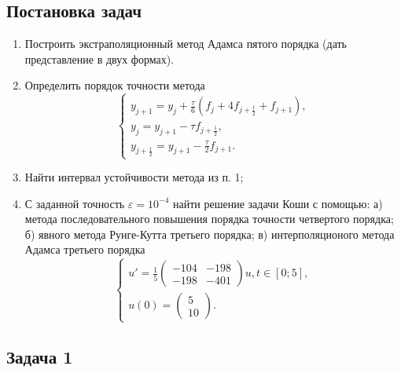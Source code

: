 \documentclass[11pt]{article}
\providecommand{\tightlist}{%
      \setlength{\itemsep}{0pt}\setlength{\parskip}{0pt}}
\begin{document}
    \subsection*{Постановка
задач}\label{ux43fux43eux441ux442ux430ux43dux43eux432ux43aux430-ux437ux430ux434ux430ux447}

    \begin{enumerate}
\def\labelenumi{\arabic{enumi}.}
\tightlist
\item
  Построить экстраполяционный метод Адамса пятого порядка (дать
  представление в двух формах).
\item
  Определить порядок точности метода \[\begin{cases}
  y_{j+1}=y_j+\frac{\tau}{6}(f_j+4f_{j+\frac{1}{2}}+f_{j+1}),\\
  y_j=y_{j+1}-\tau f_{j+\frac{1}{2}}, \\
  y_{j+\frac{1}{2}}=y_{j+1}-\frac{\tau}{2}f_{j+1}.
  \end{cases}\]
\item
  Найти интервал устойчивости метода из п. 1;
\item
  С заданной точность \(\varepsilon=10^{-4}\) найти решение задачи Коши
  с помощью: а) метода последовательного повышения порядка точности
  четвертого порядка; б) явного метода Рунге-Кутта третьего порядка; в)
  интерполяционого метода Адамса третьего порядка \[\begin{cases}
  u'=\frac{1}{5}\begin{pmatrix}-104 & -198 \\
  -198 & -401 \end{pmatrix} u, t \in [0; 5], \\
  u(0)=\begin{pmatrix}5 \\ 10 \end{pmatrix}.
  \end{cases}\]
\end{enumerate}

    \subsection*{Задача 1}\label{ux437ux430ux434ux430ux447ux430-1}
\end{document}
